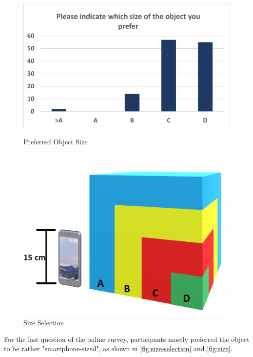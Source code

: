 \documentclass[
  a4paper,  %
  twoside,  %
  bibliography=totoc,
  headsepline,
  cleardoublepage=empty,
  parskip=half,
  draft=false
]{scrbook}
\begin{document}
\begin{figure}[H]
  \centering
  \begin{minipage}[b]{0.45\textwidth}
    \includegraphics[width=\textwidth]{graphics/Size.png}
    \caption{Preferred Object Size}
    \label{fig:size-selection}
  \end{minipage}
  \hfill
  \begin{minipage}[b]{0.45\textwidth}
    \includegraphics[width=\textwidth]{graphics/Sizeselect+prototype.png}
    \caption{Size Selection}
    \label{fig:size}
  \end{minipage}
\end{figure}

For the last question of the online survey, participants mostly preferred the object to be rather "smartphone-sized", as shown in \autoref{fig:size-selection} and \autoref{fig:size}.
\end{document}

